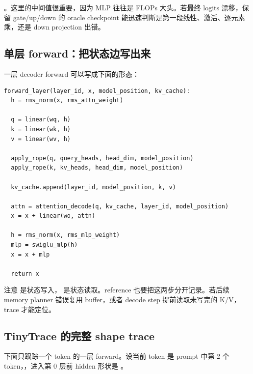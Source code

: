 。这里的中间值很重要，因为 MLP 往往是 FLOPs 大头。若最终 logits 漂移，保留 gate/up/down 的 oracle checkpoint 能迅速判断是第一段线性、激活、逐元素乘，还是 down projection 出错。

\subsection{单层 forward：把状态边写出来}

一层 decoder forward 可以写成下面的形态：

\begin{lstlisting}[numbers=none,caption={单层 decoder reference forward}]
forward_layer(layer_id, x, model_position, kv_cache):
  h = rms_norm(x, rms_attn_weight)

  q = linear(wq, h)
  k = linear(wk, h)
  v = linear(wv, h)

  apply_rope(q, query_heads, head_dim, model_position)
  apply_rope(k, kv_heads, head_dim, model_position)

  kv_cache.append(layer_id, model_position, k, v)

  attn = attention_decode(q, kv_cache, layer_id, model_position)
  x = x + linear(wo, attn)

  h = rms_norm(x, rms_mlp_weight)
  mlp = swiglu_mlp(h)
  x = x + mlp

  return x
\end{lstlisting}

注意  是状态写入， 是状态读取。reference 也要把这两步分开记录。若后续 memory planner 错误复用 buffer，或者 decode step 提前读取未写完的 K/V，trace 才能定位。

\subsection{TinyTrace 的完整 shape trace}

下面只跟踪一个 token 的一层 forward。设当前 token 是 prompt 中第 2 个 token，，进入第 0 层前 hidden 形状是 \code{[H]=[8]}。

